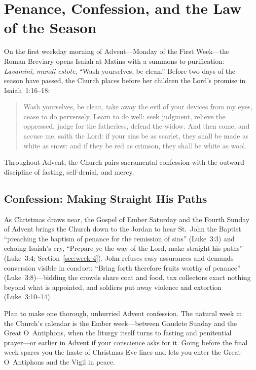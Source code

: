 \section{Penance, Confession, and the Law of the Season}\label{sec:penance-law}

On the first weekday morning of Advent---Monday of the First Week---the Roman Breviary opens Isaiah at Matins with a summons to purification: \textit{Lavamini, mundi estote}, ``Wash yourselves, be clean.'' Before two days of the season have passed, the Church places before her children the Lord's promise in Isaiah~1:16--18:

\begin{quote}
Wash yourselves, be clean, take away the evil of your devices from my eyes, cease to do perversely, Learn to do well: seek judgment, relieve the oppressed, judge for the fatherless, defend the widow. And then come, and accuse me, saith the Lord: if your sins be as scarlet, they shall be made as white as snow: and if they be red as crimson, they shall be white as wool.
\end{quote}

Throughout Advent, the Church pairs sacramental confession with the outward discipline of fasting, self-denial, and mercy.

\subsection{Confession: Making Straight His Paths}

As Christmas draws near, the Gospel of Ember Saturday and the Fourth Sunday of Advent brings the Church down to the Jordan to hear St.~John the Baptist ``preaching the baptism of penance for the remission of sins'' (Luke~3:3) and echoing Isaiah's cry, ``Prepare ye the way of the Lord, make straight his paths'' (Luke~3:4; Section~\ref{sec:week-4}). John refuses easy assurances and demands conversion visible in conduct: ``Bring forth therefore fruits worthy of penance'' (Luke~3:8)---bidding the crowds share coat and food, tax collectors exact nothing beyond what is appointed, and soldiers put away violence and extortion (Luke~3:10--14).

Plan to make one thorough, unhurried Advent confession. The natural week in the Church's calendar is the Ember week---between Gaudete Sunday and the Great O~Antiphons, when the liturgy itself turns to fasting and penitential prayer---or earlier in Advent if your conscience asks for it. Going before the final week spares you the haste of Christmas Eve lines and lets you enter the Great O~Antiphons and the Vigil in peace.

